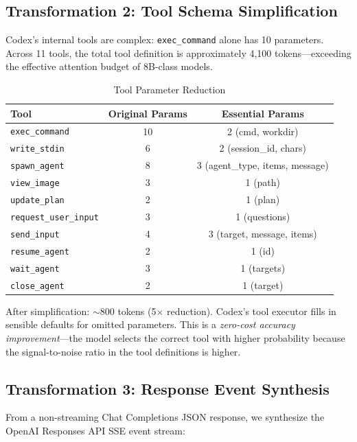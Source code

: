 \documentclass[11pt,a4paper]{article}
\begin{document}
\subsection{Transformation 2: Tool Schema Simplification}

Codex's internal tools are complex: \texttt{exec\_command} alone has 10
parameters. Across 11 tools, the total tool definition is approximately
4,100 tokens---exceeding the effective attention budget of 8B-class models.

\begin{table}[H]
\centering
\caption{Tool Parameter Reduction}
\label{tab:tools}
\begin{tabular}{lcc}
\toprule
\textbf{Tool} & \textbf{Original Params} & \textbf{Essential Params} \\
\midrule
\texttt{exec\_command}    & 10 & 2 (cmd, workdir) \\
\texttt{write\_stdin}     & 6  & 2 (session\_id, chars) \\
\texttt{spawn\_agent}     & 8  & 3 (agent\_type, items, message) \\
\texttt{view\_image}      & 3  & 1 (path) \\
\texttt{update\_plan}     & 2  & 1 (plan) \\
\texttt{request\_user\_input} & 3 & 1 (questions) \\
\texttt{send\_input}      & 4  & 3 (target, message, items) \\
\texttt{resume\_agent}    & 2  & 1 (id) \\
\texttt{wait\_agent}      & 3  & 1 (targets) \\
\texttt{close\_agent}     & 2  & 1 (target) \\
\bottomrule
\end{tabular}
\end{table}

After simplification: $\sim$800 tokens (5$\times$ reduction). Codex's tool
executor fills in sensible defaults for omitted parameters. This is a
\textit{zero-cost accuracy improvement}---the model selects the correct tool
with higher probability because the signal-to-noise ratio in the tool
definitions is higher.

\subsection{Transformation 3: Response Event Synthesis}

From a non-streaming Chat Completions JSON response, we synthesize the
OpenAI Responses API SSE event stream:
\end{document}
